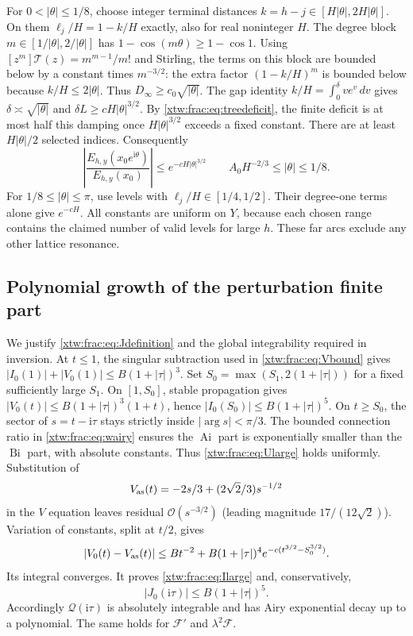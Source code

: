 \documentclass[11pt]{article}
\theoremstyle{remark}\newtheorem{remark}[theorem]{Remark}
\newcommand{\OO}{\mathcal O}
\newcommand{\Ai}{\operatorname{Ai}}
\newcommand{\Bi}{\operatorname{Bi}}
\newcommand{\ii}{\mathrm i}
\newcommand{\FF}{\mathcal F}
\newcommand{\QQ}{\mathcal Q}
\newcommand{\TT}{\mathcal T}
\begin{document}
For $0<|\theta|\le1/8$, choose integer terminal distances
$k=h-j\in[H|\theta|,2H|\theta|]$. On them
$\ell_j/H=1-k/H$ exactly, also for real noninteger $H$.
The degree block $m\in[1/|\theta|,2/|\theta|]$ has
$1-\cos(m\theta)\ge1-\cos1$.
Using $[z^m]\TT(z)=m^{m-1}/m!$ and Stirling, the terms on this block
are bounded below by a constant times $m^{-3/2}$: the extra factor
$(1-k/H)^m$ is bounded below because $k/H\le2|\theta|$.
Thus $D_\infty\ge c_0\sqrt{|\theta|}$.
The gap identity
$k/H=\int_0^\delta v e^v\,dv$ gives
$\delta\asymp\sqrt{|\theta|}$ and
$\delta L\ge cH|\theta|^{3/2}$.
By \eqref{xtw:frac:eq:treedeficit}, the finite deficit is at most half this damping
once $H|\theta|^{3/2}$ exceeds a fixed constant. There are at least
$H|\theta|/2$ selected indices. Consequently
\begin{equation}\label{xtw:frac:eq:minorbound}
 \left|\frac{E_{h,y}(x_0e^{\ii\theta})}{E_{h,y}(x_0)}\right|
 \le e^{-cH|\theta|^{3/2}}\qquad
 A_0H^{-2/3}\le|\theta|\le1/8.
\end{equation}
For $1/8\le|\theta|\le\pi$, use levels with
$\ell_j/H\in[1/4,1/2]$. Their degree-one terms alone give $e^{-cH}$.
All constants are uniform on $Y$, because each chosen range contains the
claimed number of valid levels for large $h$. These far arcs exclude any
other lattice resonance.

\subsection{Polynomial growth of the perturbation finite part}
We justify \eqref{xtw:frac:eq:Jdefinition} and the global integrability required
in inversion. At $t\le1$, the singular subtraction used in
\eqref{xtw:frac:eq:Vbound} gives
$|I_0(1)|+|V_0(1)|\le B(1+|\tau|)^3$.
Set $S_0=\max(S_1,2(1+|\tau|))$ for a fixed sufficiently large $S_1$.
On $[1,S_0]$, stable propagation gives
$|V_0(t)|\le B(1+|\tau|)^3(1+t)$, hence
$|I_0(S_0)|\le B(1+|\tau|)^5$.
On $t\ge S_0$, the sector of $s=t-\ii\tau$ stays strictly inside
$|\arg s|<\pi/3$. The bounded connection ratio in \eqref{xtw:frac:eq:wairy}
ensures the $\Ai$ part is exponentially smaller than the $\Bi$ part,
with absolute constants. Thus \eqref{xtw:frac:eq:Ularge} holds uniformly.
Substitution of
\[
 V_{\rm as}(t)=-2s/3+(2\sqrt2/3)s^{-1/2}
\]
in the $V$ equation leaves residual $\OO(s^{-3/2})$ (leading magnitude
$17/(12\sqrt2)$). Variation of constants, split at $t/2$, gives
\[
 |V_0(t)-V_{\rm as}(t)|\le Bt^{-2}
 +B(1+|\tau|)^4 e^{-c(t^{3/2}-S_0^{3/2})}.
\]
Its integral converges. It proves \eqref{xtw:frac:eq:Ilarge} and, conservatively,
\begin{equation}\label{xtw:frac:eq:Jpolynomial}
 |J_0(\ii\tau)|\le B(1+|\tau|)^5.
\end{equation}
Accordingly $\QQ(\ii\tau)$ is absolutely integrable and has Airy
exponential decay up to a polynomial. The same holds for $\FF'$ and
$\lambda^2\FF$.
\end{document}
